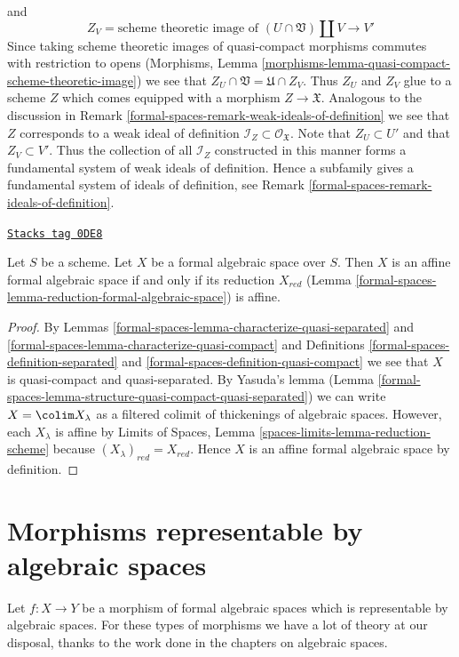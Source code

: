 \begin{remark}
$$$$
and
$$
Z_V = \text{scheme theoretic image of }
(U \cap \mathfrak V) \amalg V \longrightarrow V'
$$
Since taking scheme theoretic images of quasi-compact morphisms
commutes with restriction to opens (Morphisms, Lemma
\ref{morphisms-lemma-quasi-compact-scheme-theoretic-image})
we see that $Z_U \cap \mathfrak V = \mathfrak U \cap Z_V$.
Thus $Z_U$ and $Z_V$ glue to a scheme $Z$ which comes equipped
with a morphism $Z \to \mathfrak X$. Analogous to the discussion in
Remark \ref{formal-spaces-remark-weak-ideals-of-definition}
we see that $Z$ corresponds to a weak ideal
of definition $\mathcal{I}_Z \subset \mathcal{O}_\mathfrak X$.
Note that $Z_U \subset U'$ and that
$Z_V \subset V'$. Thus the collection of all $\mathcal{I}_Z$
constructed in this manner forms a fundamental system of weak
ideals of definition. Hence a subfamily gives a fundamental system of ideals
of definition, see Remark \ref{formal-spaces-remark-ideals-of-definition}.
\end{remark}

\begin{lemma}
\label{formal-spaces-lemma-characterize-affine}
\href{https://stacks.math.columbia.edu/tag/0DE8}{\texttt{Stacks tag 0DE8}}

Let $S$ be a scheme. Let $X$ be a formal algebraic space over $S$.
Then $X$ is an affine formal algebraic space if and only if
its reduction $X_{red}$ (Lemma \ref{formal-spaces-lemma-reduction-formal-algebraic-space})
is affine.
\end{lemma}

\begin{proof}
By Lemmas \ref{formal-spaces-lemma-characterize-quasi-separated} and
\ref{formal-spaces-lemma-characterize-quasi-compact} and
Definitions \ref{formal-spaces-definition-separated} and \ref{formal-spaces-definition-quasi-compact}
we see that $X$ is quasi-compact and quasi-separated.
By Yasuda's lemma (Lemma \ref{formal-spaces-lemma-structure-quasi-compact-quasi-separated})
we can write $X = \colim X_\lambda$ as a filtered colimit
of thickenings of algebraic spaces. However, each $X_\lambda$
is affine by Limits of Spaces, Lemma
\ref{spaces-limits-lemma-reduction-scheme}
because $(X_\lambda)_{red} = X_{red}$.
Hence $X$ is an affine formal algebraic space by definition.
\end{proof}

\section{Morphisms representable by algebraic spaces}
\label{formal-spaces-section-representable}
Let $f : X \to Y$ be a morphism of formal algebraic spaces which
is representable by algebraic spaces. For these types of morphisms
we have a lot of theory at our disposal, thanks to the work done
in the chapters on algebraic spaces.

